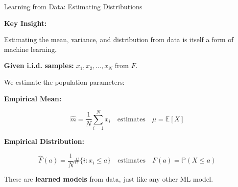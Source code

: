 \documentclass{beamer}
\begin{document}
\begin{frame}{Learning from Data: Estimating Distributions}

\textbf{Key Insight:}

Estimating the mean, variance, and distribution from data is itself a form of machine learning.

\textbf{Given i.i.d. samples:}
\(
x_1, x_2, \ldots, x_N 
\) from $F$.

We estimate the population parameters:


\textbf{Empirical Mean:}

\[
\hat{m} = \frac{1}{N} \sum_{i=1}^{N} x_i \quad \text{estimates} \quad \mu = \mathbb{E}[X]
\]

\textbf{Empirical Distribution:}

\[
\hat{F}(a) = \frac{1}{N} \#\{i : x_i \le a\} \quad \text{estimates} \quad F(a) = \mathbb{P}(X \le a)
\]


These are \textbf{learned models} from data, just like any other ML model.

\end{frame}
\end{document}
